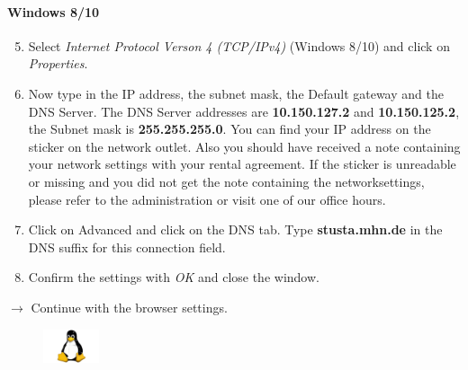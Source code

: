 \documentclass[a4paper,12pt]{scrartcl}
\begin{document}
\paragraph*{Windows 8/10}
\begin{enumerate}
    \setcounter{enumi}{4}
	\item Select \emph{Internet Protocol Verson 4 (TCP/IPv4)} (Windows 8/10) and click on \emph{Properties}.
    \item Now type in the IP address, the subnet mask, the Default gateway and the DNS Server. The DNS Server addresses are \textbf{10.150.127.2} and \textbf{10.150.125.2}, the Subnet mask is \textbf{255.255.255.0}. You can find your IP address on the sticker on the network outlet. Also you should have received a note containing your network settings with your rental agreement. If the sticker is unreadable or missing and you did not get the note containing the networksettings, please refer to the administration or visit one of our office hours.
    \item Click on Advanced and click on the DNS tab. Type \textbf{stusta.mhn.de} in the DNS suffix for this connection field.
	\item Confirm the settings with \emph{OK} and close the window.
\end{enumerate}
$\rightarrow$ Continue with the browser settings.


\pagebreak

\begin{figure}[t!]
    \raggedleft
    \vspace{-20pt}
    \includegraphics[height=1cm,keepaspectratio]{Bilder/linux_logo_neu}
    \vspace{-30pt}
\end{figure}
\end{document}
